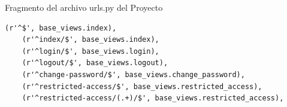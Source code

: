 Fragmento del archivo urls.py del Proyecto\\[0.1cm]

\begin{lstlisting}[style=HTML]
    (r'^$', base_views.index),
    (r'^index/$', base_views.index),
    (r'^login/$', base_views.login),
    (r'^logout/$', base_views.logout),
    (r'^change-password/$', base_views.change_password),
    (r'^restricted-access/$', base_views.restricted_access),
    (r'^restricted-access/(.+)/$', base_views.restricted_access),
\end{lstlisting}

\vspace{0.1cm}
